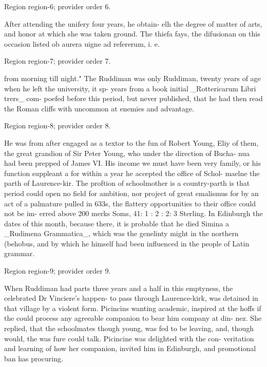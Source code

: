 \documentclass[11pt]{article}
\begin{document}
{\scriptsize\color{gray} Region region-6; provider order 6.\par}
\medskip

After attending the unifery four years, he obtain- elh the degree of matter of arts, and honor at which she was taken ground. The thiefa fays, the difusionan on this occasion listed ob aurera uigne ad refererum, i. e.
\par

{\scriptsize\color{gray} Region region-7; provider order 7.\par}
\medskip

from morning till night." The Ruddiman was only Ruddiman, twenty years of age when he left the university, it sp- years from a book initial \_Rottericarum Libri trers\_ com- poefed before this period, but never published, that he had then read the Roman cliffs with uncommon at enemies and advantage.
\par

{\scriptsize\color{gray} Region region-8; provider order 8.\par}
\medskip

He was from after engaged as a textor to the fun of Robert Young, Eliy of them, the great grandion of Sir Peter Young, who under the direction of Bucha- nua had been prepped of James VI. His income we must have been very family, or his function suppleant a for within a year he accepted the office of Schol- maelne the parth of Laurence-kir. The proftion of schoolmother is a country-parth is that period could open no field for ambition, nor project of great emalismus for by an act of a palmature pulled in 633s, the flattery opportunities to their office could not be im- erred above 200 merks Soms, 41: 1 : 2 : 2: 3 Sterling. In Edinburgh the dates of this month, because there, it is probable that he died Simina a \_Rudimena Grammatica\_, which was the genelinty might in the northern (behobus, and by which he himself had been influenced in the people of Latin grammar.
\par

{\scriptsize\color{gray} Region region-9; provider order 9.\par}
\medskip

When Ruddiman had parts three years and a half in this emptyness, the celebrated Dr Vinciere’s happen- to pass through Laurence-kirk, was detained in that village by a violent form. Picincins wanting academic, inspired at the hoffs if the could process any agreeable companion to bear him company at din- nez. She replied, that the schoolmates though young, was fed to be leaving, and, though would, the was fure could talk. Picincine was delighted with the con- veritation and learning of how her companion, invited him in Edinburgh, and promotional ban has procuring.
\par
\end{document}
